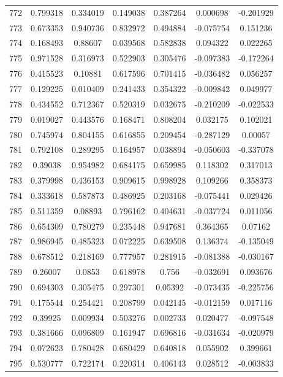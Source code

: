 \begin{table}
\begin{tabular}{c|c|c|c|c|c|c}
772 & 0.799318 & 0.334019 & 0.149038 & 0.387264 & 0.000698 & -0.201929\\
773 & 0.673353 & 0.940736 & 0.832972 & 0.494884 & -0.075754 & 0.151236\\
774 & 0.168493 & 0.88607 & 0.039568 & 0.582838 & 0.094322 & 0.022265\\
775 & 0.971528 & 0.316973 & 0.522903 & 0.305476 & -0.097383 & -0.172264\\
776 & 0.415523 & 0.10881 & 0.617596 & 0.701415 & -0.036482 & 0.056257\\
777 & 0.129225 & 0.010409 & 0.241433 & 0.354322 & -0.009842 & 0.049977\\
778 & 0.434552 & 0.712367 & 0.520319 & 0.032675 & -0.210209 & -0.022533\\
779 & 0.019027 & 0.443576 & 0.168471 & 0.808204 & 0.032175 & 0.102021\\
780 & 0.745974 & 0.804155 & 0.616855 & 0.209454 & -0.287129 & 0.00057\\
781 & 0.792108 & 0.289295 & 0.164957 & 0.038894 & -0.050603 & -0.337078\\
782 & 0.39038 & 0.954982 & 0.684175 & 0.659985 & 0.118302 & 0.317013\\
783 & 0.379998 & 0.436153 & 0.909615 & 0.998928 & 0.109266 & 0.358373\\
784 & 0.333618 & 0.587873 & 0.486925 & 0.203168 & -0.075441 & 0.029426\\
785 & 0.511359 & 0.08893 & 0.796162 & 0.404631 & -0.037724 & 0.011056\\
786 & 0.654309 & 0.780279 & 0.235448 & 0.947681 & 0.364365 & 0.07162\\
787 & 0.986945 & 0.485323 & 0.072225 & 0.639508 & 0.136374 & -0.135049\\
788 & 0.678512 & 0.218169 & 0.777957 & 0.281915 & -0.081388 & -0.030167\\
789 & 0.26007 & 0.0853 & 0.618978 & 0.756 & -0.032691 & 0.093676\\
790 & 0.694303 & 0.305475 & 0.297301 & 0.05392 & -0.073435 & -0.225756\\
791 & 0.175544 & 0.254421 & 0.208799 & 0.042145 & -0.012159 & 0.017116\\
792 & 0.39925 & 0.009934 & 0.503276 & 0.002733 & 0.020477 & -0.097548\\
793 & 0.381666 & 0.096809 & 0.161947 & 0.696816 & -0.031634 & -0.020979\\
794 & 0.072623 & 0.780428 & 0.680429 & 0.640818 & 0.055902 & 0.399661\\
795 & 0.530777 & 0.722174 & 0.220314 & 0.406143 & 0.028512 & -0.003833\\

\end{tabular}
\end{table}
